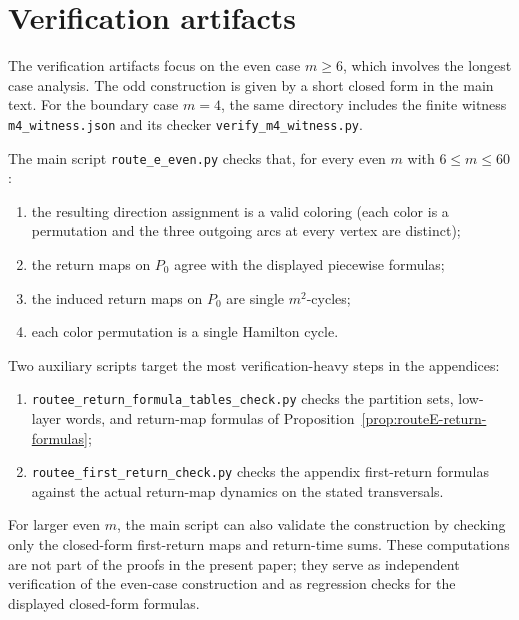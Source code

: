 \section{Verification artifacts}\label{app:verification}

The verification artifacts focus on the even case $m\ge 6$, which involves the longest case analysis.
The odd construction is given by a short closed form in the main text.
For the boundary case $m=4$, the same directory includes the finite witness \texttt{m4\_witness.json} and its checker \texttt{verify\_m4\_witness.py}.

The main script \texttt{route\_e\_even.py} checks that, for every even $m$ with $6\le m\le 60$:
\begin{enumerate}[leftmargin=2.2em]
\item the resulting direction assignment is a valid coloring (each color is a permutation and the three outgoing arcs at every vertex are distinct);
\item the return maps on $P_0$ agree with the displayed piecewise formulas;
\item the induced return maps on $P_0$ are single $m^2$-cycles;
\item each color permutation is a single Hamilton cycle.
\end{enumerate}
Two auxiliary scripts target the most verification-heavy steps in the appendices:
\begin{enumerate}[leftmargin=2.2em,label=(\alph*)]
\item \texttt{routee\_return\_formula\_tables\_check.py} checks the partition sets, low-layer words, and return-map formulas of Proposition~\ref{prop:routeE-return-formulas};
\item \texttt{routee\_first\_return\_check.py} checks the appendix first-return formulas against the actual return-map dynamics on the stated transversals.
\end{enumerate}
For larger even $m$, the main script can also validate the construction by checking only the closed-form first-return maps and return-time sums.
These computations are not part of the proofs in the present paper; they serve as independent verification of the even-case construction and as regression checks for the displayed closed-form formulas.

